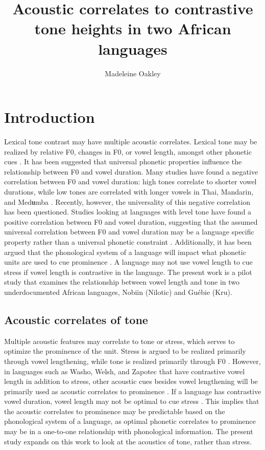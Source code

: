 \documentclass[output=paper]{langscibook}
\author{Madeleine Oakley\affiliation{Georgetown University}}
\title{Acoustic correlates to contrastive tone heights in two African languages}
\begin{document}
\maketitle

\section{Introduction}\label{sec:oakley:1}

Lexical tone contrast may have multiple acoustic correlates. Lexical tone may be realized by relative F0, changes in F0, or vowel length, amongst other phonetic cues \citep{abramson1979, zhang2001, levi2005, brunelle2016, alan2010}.  It has been suggested that universal phonetic properties influence the relationship between F0 and vowel duration. Many studies have found a negative correlation between F0 and vowel duration: high tones correlate to shorter vowel durations, while low tones are correlated with longer vowels in Thai, Mandarin, and Medʉmba \citep{gandour1977interaction, dreher1968instrumental, franich2016internal}. Recently, however, the universality of this negative correlation has been questioned. Studies looking at languages with level tone have found a positive correlation between F0 and vowel duration, suggesting that the assumed universal correlation between F0 and vowel duration may be a language specific property rather than a universal phonetic constraint \citep{alan2010, Mamadou2018, Kpodo2018}. Additionally, it has been argued that the phonological system of a language will impact what phonetic units are used to cue prominence \citep{remijsen2014study}. A language may not use vowel length to cue stress if vowel length is contrastive in the language. The present work is a pilot study that examines the relationship between vowel length and tone in two underdocumented African languages, Nobiin (Nilotic) and Guébie (Kru).

\subsection{Acoustic correlates of tone}
\begin{sloppypar}
Multiple acoustic features may correlate to tone or stress, which serves to optimize the prominence of the unit. Stress is argued to be realized primarily through vowel lengthening, while tone is realized primarily through F0 \citep{remijsen2014study, lunden2017vowel}. However, in languages such as Washo, Welsh, and Zapotec that have contrastive vowel length in addition to stress, other acoustic cues besides vowel lengthening will be primarily used as acoustic correlates to prominence \citep{remijsen2014study}. If a language has contrastive vowel duration, vowel length may not be optimal to cue stress \citep{berinstein1979cross, remijsen2014study}. This implies that the acoustic correlates to prominence may be predictable based on the phonological system of a language, as optimal phonetic correlates to prominence may be in a one-to-one relationship with phonological information. The present study expands on this work to look at the acoustics of tone, rather than stress.
\end{sloppypar}
\end{document}
